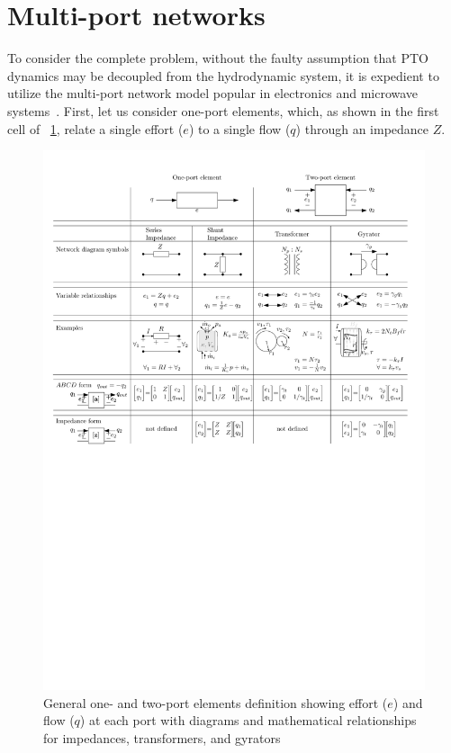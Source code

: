 \documentclass[lettersize,journal]{IEEEtran}
\newcommand{\rc}[1]{\textcolor{red}{#1}}
\begin{document}
\section{Multi-port networks}\label{sec:multi_port_networks}
To consider the complete problem, without the faulty assumption that PTO dynamics may be decoupled from the hydrodynamic system, it is expedient to utilize the multi-port network model popular in electronics and microwave systems~\cite{Marrocco:2008aa,CircuitFundamental}.
First, let us consider one-port elements, which, as shown in the first cell of \figurename~\ref{fig:wec_as_multiport_transformer_gyrator}, relate a single effort ($e$) to a single flow ($q$) through an impedance $Z$.


\begin{figure}
	\centering
	\includegraphics[width=\textwidth]{wec_as_multiport_transformer_gyrator_impedance_Z_A.pdf}
	\caption{General one- and two-port elements definition showing effort ($e$) and flow ($q$) at each port with diagrams and mathematical relationships for impedances, transformers, and gyrators}
	\label{fig:wec_as_multiport_transformer_gyrator}
\end{figure}
\end{document}
